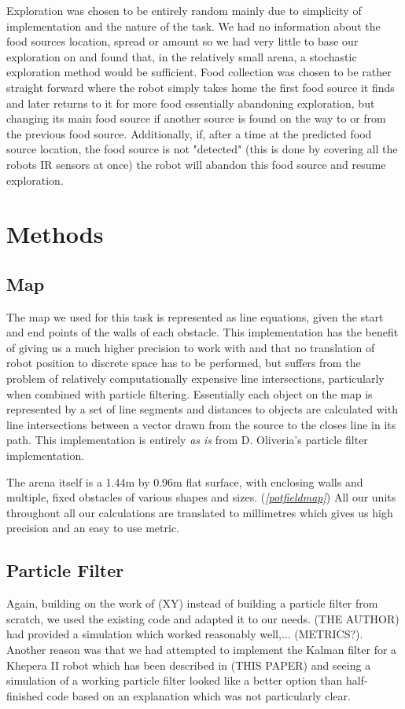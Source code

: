 \documentclass[paper=a4, fontsize=12pt]{scrartcl}	%
\numberwithin{equation}{section}		%
\numberwithin{figure}{section}			%
\numberwithin{table}{section}				%
\begin{document}
Exploration was chosen to be entirely random mainly due to simplicity of implementation and the nature of the task. We had no information about the food sources location, spread or amount so we had very little to base our exploration on and found that, in the relatively small arena, a stochastic exploration method would be sufficient. Food collection was chosen to be rather straight forward where the robot simply takes home the first food source it finds and later returns to it for more food essentially abandoning exploration, but changing its main food source if another source is found on the way to or from the previous food source. Additionally, if, after a time at the predicted food source location, the food source is not "detected" (this is done by covering all the robots IR sensors at once) the robot will abandon this food source and resume exploration.

\section{Methods} 
\subsection{Map}
The map we used for this task is represented as line equations, given the start and end points of the walls of each obstacle. This implementation has the benefit of giving us a much higher precision to work with and that no translation of robot position to discrete space has to be performed, but suffers from the problem of relatively computationally expensive line intersections, particularly when combined with particle filtering. Essentially each object on the map is represented by a set of line segments and distances to objects are calculated with line intersections between a vector drawn from the source to the closes line in its path. This implementation is entirely \emph{as is} from D. Oliveria's particle filter implementation.\cite{oliveira}

The arena itself is a 1.44m by 0.96m flat surface, with enclosing walls and multiple, fixed obstacles of various shapes and sizes. (\emph{\ref{potfieldmap}}) All our units throughout all our calculations are translated to millimetres which gives us high precision and an easy to use metric.

\subsection{Particle Filter}
Again, building on the work of (XY) instead of building a particle filter from scratch, we used the existing code and adapted it to our needs. (THE AUTHOR) had provided a simulation which worked reasonably well,... (METRICS?). Another reason was that we had attempted to implement the Kalman filter for a Khepera II robot which has been described in (THIS PAPER) and seeing a simulation of a working particle filter looked like a better option than half-finished code based on an explanation which was not particularly clear.
\end{document}
